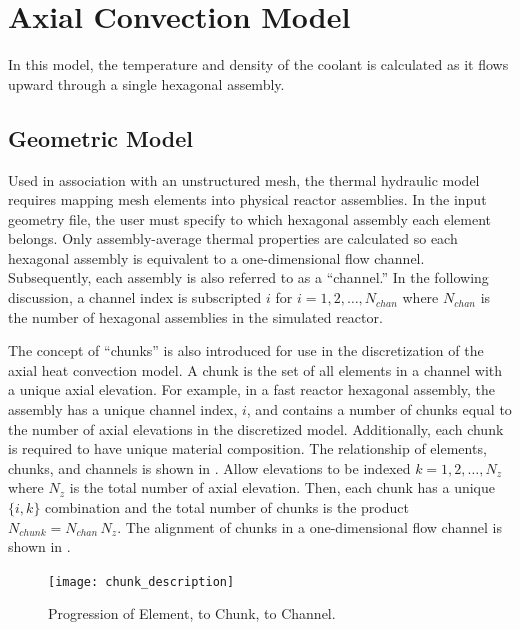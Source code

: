 \section{Axial Convection Model}
  \label{sec:axial_convection_model}
  In this model, the temperature and density of the coolant is calculated as
  it flows upward through a single hexagonal assembly.

  \subsection{Geometric Model}
    Used in association with an unstructured mesh, the thermal hydraulic model
    requires mapping mesh elements into physical reactor assemblies. In the
    input geometry file, the user must specify to which hexagonal assembly each
    element belongs.  Only assembly-average thermal properties are calculated so
    each hexagonal assembly is equivalent to a one-dimensional flow channel.
    Subsequently, each assembly is also referred to as a ``channel.'' In the
    following discussion, a channel index is subscripted $i$ for $i =
    1,2,\ldots,N_{chan}$ where $N_{chan}$ is the number of hexagonal assemblies
    in the simulated reactor. 

    The concept of ``chunks'' is also introduced for use in the discretization
    of the axial heat convection model. A chunk is the set of all elements in a
    channel with a unique axial elevation. For example, in a fast reactor
    hexagonal assembly, the assembly has a unique channel index, $i$, and
    contains a number of chunks equal to the number of axial elevations in the
    discretized model.  Additionally, each chunk is required to have unique
    material composition.  The relationship of elements, chunks, and channels is
    shown in . Allow elevations to be indexed $k =
    1,2,\ldots,N_z$ where $N_z$ is the total number of axial elevation. Then,
    each chunk has a unique $\{i,k\}$ combination and the total number of chunks
    is the product $N_{chunk} = N_{chan} \, N_z$.
    The alignment of chunks in a one-dimensional flow channel is shown in
    .

    \begin{figure}
      \centering
      \texttt{[image: chunk\_description]}
      \caption{Progression of Element, to Chunk, to Channel.}
      \label{fig:chunk_description}
    \end{figure}
    

